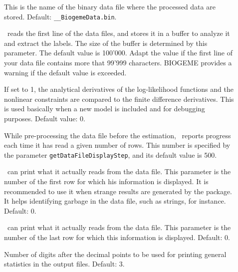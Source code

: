 \documentclass[12pt]{memoir}
\begin{document}
\begin{description}
\begin{description}
        \item[] This is the name of the binary data file where the processed data are stored. Default: \texttt{\_\_BiogemeData.bin}.

      \item[] \BIOGEME\ reads the first line of the
         data files, and stores it in a buffer to analyze it and extract the
         labels. The size of the buffer is determined by this parameter. The
         default value is 100'000. Adapt the value if the first line of your
         data file contains more that 99'999 characters. BIOGEME
         provides a warning if the default value is exceeded. 
         

      \item[] If set to 1, the analytical
         derivatives of the log-likelihood functions and the nonlinear 
         constraints are compared to the finite difference derivatives. This
         is used basically when a new model is included and for debugging
         purposes. Default value: 0. 
         
      \item[] While pre-processing the data file before the 
         estimation, \BIOGEME\ reports progress each time it has read a given number of rows.  
         This number is specified by the parameter \verb+getDataFileDisplayStep+, and its default 
         value is 500.

       \item[] \BIOGEME\ can print
what it actually reads from the data file. This parameter is the number
of the first row for which his information is displayed. It is
recommended to use it when strange results are generated by the
package. It helps identifying garbage in the data file, such as
strings, for instance.  Default: 0.

   \item[] \BIOGEME\ can print
what it actually reads from the data file. This parameter is the number
of the last row for which this information is displayed. Default: 0.

\item[] Number of digits after the decimal points to be used for printing general statistics in the output files. Default: 3.


\end{description}
\end{description}
\end{document}
